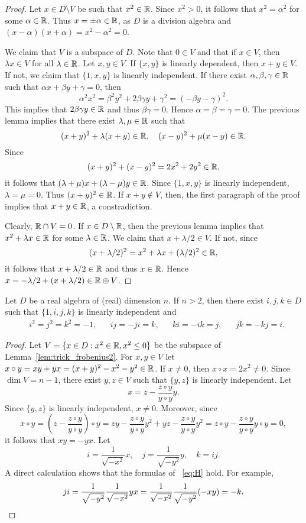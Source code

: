 \begin{proof}
	Let $x\in D\setminus V$ be such that $x^2\in\mathbb{R}$. Since $x^2>0$, it follows
	that $x^2=\alpha^2$ for some $\alpha\in\mathbb{R}$. Thus $x=\pm\alpha\in\mathbb{R}$, as $D$
	is a division algebra and $(x-\alpha)(x+\alpha)=x^2-\alpha^2=0$.

	We claim that $V$ is a subspace of $D$.  Note that $0\in V$ and 
	that if $x\in V$, then $\lambda x\in V$ for all $\lambda\in\mathbb{R}$.  Let 
	$x,y\in V$. If $\{x,y\}$ is linearly dependent, then $x+y\in V$.
	If not, we claim that 
	$\{1,x,y\}$ is linearly independent. If there exist 
	$\alpha,\beta,\gamma\in\mathbb{R}$ such that $\alpha x+\beta y+\gamma=0$, then 
	\[
	\alpha^2x^2=\beta^2y^2+2\beta\gamma y+\gamma^2=(-\beta y-\gamma)^2.
	\]
	This implies that $2\beta\gamma y\in\mathbb{R}$ and thus $\beta\gamma=0$. Hence 
	$\alpha=\beta=\gamma=0$. The previous lemma implies that there exist 
	$\lambda,\mu\in\mathbb{R}$ such that 
	\[
		(x+y)^2+\lambda(x+y)\in\mathbb{R},\quad
		(x-y)^2+\mu(x-y)\in\mathbb{R}.
	\]
	Since 
	\[
		(x+y)^2+(x-y)^2=2x^2+2y^2\in\mathbb{R},
	\]
	it follows that $(\lambda+\mu)x+(\lambda-\mu)y\in\mathbb{R}$. Since  $\{1,x,y\}$ is linearly 
	independent, 
	$\lambda=\mu=0$. Thus $(x+y)^2\in\mathbb{R}$. If 
	$x+y\not\in V$, then, the first paragraph of the proof implies that 
	$x+y\in\mathbb{R}$, a constradiction. 

	Clearly, $\mathbb{R}\cap V=0$. If $x\in D\setminus\mathbb{R}$, then the previous lemma 
	implies that $x^2+\lambda x\in\mathbb{R}$ for some 
	$\lambda\in\mathbb{R}$. We claim that $x+\lambda/2\in V$. If not, since 
	\[
	(x+\lambda/2)^2=x^2+\lambda x+(\lambda/2)^2\in\mathbb{R},
	\]
	it follows that $x+\lambda/2\in\mathbb{R}$ and thus $x\in\mathbb{R}$. Hence 
	$x=-\lambda/2+(x+\lambda/2)\in\mathbb{R}\oplus V$.
\end{proof}

\begin{lemma}
	\label{lem:trick_frobenius3}
	Let $D$ be a real algebra of (real) dimension $n$. If $n>2$, then
	there exist $i,j,k\in D$ such that $\{1,i,j,k\}$ is linearly independent and 
	\begin{align}
	\label{eq:H}
	&i^2=j^2=k^2=-1, && ij=-ji=k, && ki=-ik=j, && jk=-kj=i.
	\end{align}
\end{lemma}

\begin{proof}
	Let $V=\{x\in D:x^2\in\mathbb{R},x^2\leq 0\}$ be the subspace of Lemma~\ref{lem:trick_frobenius2}. 
	For $x,y\in V$ let $x\circ
	y=xy+yx=(x+y)^2-x^2-y^2\in\mathbb{R}$. If $x\ne0$, then $x\circ
	x=2x^2\ne0$. Since $\dim V=n-1$, there exist $y,z\in V$ such that $\{y,z\}$ is 
	linearly independent. Let 
	\[
		x=z-\frac{z\circ y}{y\circ y}y.
	\]
	Since $\{y,z\}$ is linearly independent, $x\ne0$. Moreover, since 
	\[
		x\circ y
		=\left(z-\frac{z\circ y}{y\circ y}\right)\circ y
		=zy-\frac{z\circ y}{y\circ y}y^2+yz-\frac{z\circ y}{y\circ y}y^2
		=z\circ y-\frac{z\circ y}{y\circ y}y\circ y=0,
	\]
	it follows that $xy=-yx$. 
	Let  
	\[
		i=\frac{1}{\sqrt{-x^2}}x,
		\quad
		j=\frac{1}{\sqrt{-y^2}}y,
		\quad
		k=ij. 
	\]
	A direct calculation shows that the formulas of ~\eqref{eq:H} hold. For example, 
	\[
		ji=\frac{1}{\sqrt{-y^2}}\frac{1}{\sqrt{-x^2}}yx=\frac{1}{\sqrt{-x^2}}\frac{1}{\sqrt{-y^2}}(-xy)=-k.\qedhere
	\]
\end{proof}


